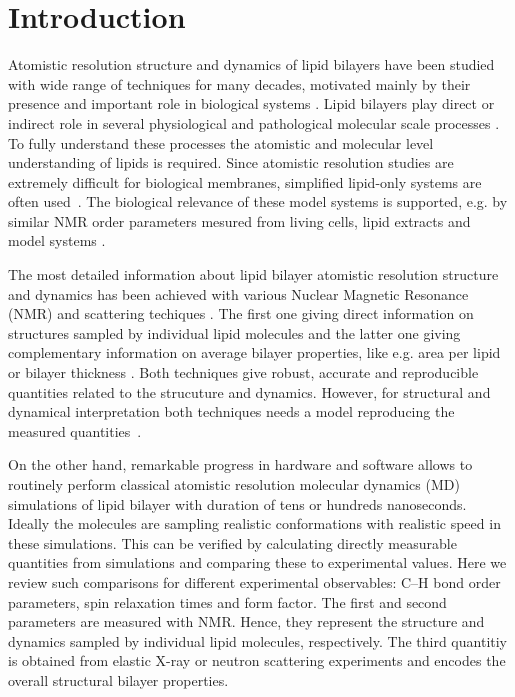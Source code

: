 \documentclass[aps,prl,superscriptaddress,twocolumn]{revtex4}
\begin{document}
\section{Introduction}
Atomistic resolution structure and dynamics of lipid bilayers have been studied
with wide range of techniques for many decades, motivated mainly
by their presence and important role in biological systems \cite{seelig77c,israelachvili80,jacobs81,davis83,bloom91,nagle00,nagle13}.
Lipid bilayers play direct or indirect role in several physiological and pathological
molecular scale processes \cite{lee04,kinnunen09,Bohdanowicz13}. To fully understand these processes the atomistic and
molecular level understanding of lipids is required. Since atomistic resolution studies are
extremely difficult for biological membranes, simplified lipid-only systems are often used~\cite{seelig77c,israelachvili80,jacobs81,davis83,bloom91,nagle00,nagle13}.
The biological relevance of these model systems is supported, e.g. by similar NMR order parameters 
mesured from living cells, lipid extracts and model systems \cite{gally81,jacobs81,scherer87}. 

The most detailed information about lipid bilayer atomistic resolution structure and dynamics has been
achieved with various Nuclear Magnetic Resonance (NMR) and scattering techiques \cite{seelig77c,jacobs81,davis83,bloom91,nagle00,pabst10,kucerka11,marquardt15}. 
The first one giving direct information on structures sampled by individual lipid molecules \cite{seelig77c,jacobs81,davis83,bloom91} and
the latter one giving complementary information on average bilayer properties, like e.g. area per lipid or bilayer thickness \cite{nagle00,pabst10,kucerka11,marquardt15}.
Both techniques give robust, accurate and reproducible quantities related to the strucuture and dynamics.
However, for structural and dynamical interpretation both techniques needs a model reproducing
the measured quantities~\cite{jacobs81,davis83,bloom91,nagle00,pabst10,kucerka11,marquardt15}. 

On the other hand, remarkable progress in hardware and software allows to 
routinely perform classical atomistic resolution molecular dynamics (MD) simulations of lipid bilayer with 
duration of tens or hundreds nanoseconds. Ideally the molecules are sampling realistic
conformations with realistic speed in these simulations. This can be verified by calculating
directly measurable quantities from simulations and comparing these to experimental values.
Here we review such comparisons for different experimental observables: C--H bond order parameters,
spin relaxation times and form factor. The first and second parameters are measured with NMR. Hence, they 
represent the structure and dynamics sampled by individual lipid molecules, respectively.
The third quantitiy is obtained from elastic X-ray or neutron scattering experiments and encodes the overall structural bilayer properties.
\end{document}
